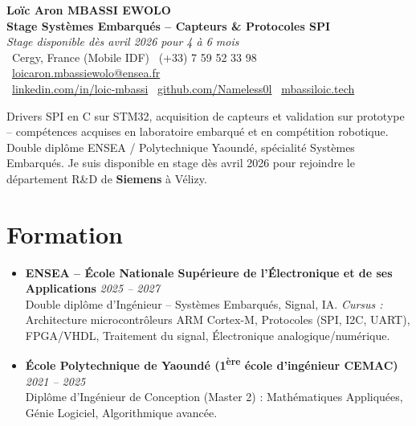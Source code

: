 \documentclass[a4paper,11pt]{article}
\begin{document}
\begin{center}
    {\Large \textbf{Loïc Aron MBASSI EWOLO}} \\ \vspace{4pt}
    \textbf{\large Stage Systèmes Embarqués -- Capteurs \& Protocoles SPI} \\
    \textit{\small Stage disponible dès avril 2026 pour 4 à 6 mois} \\ \vspace{4pt}
    \small
    \faMapMarker\ Cergy, France (Mobile IDF) \quad
    \faPhone\ (+33) 7 59 52 33 98 \quad
    \faEnvelope\ \href{mailto:loicaron.mbassiewolo@ensea.fr}{loicaron.mbassiewolo@ensea.fr} \\ \vspace{2pt}
    \faLinkedin\ \href{https://www.linkedin.com/in/loic-mbassi/}{linkedin.com/in/loic-mbassi} \quad
    \faGithub\ \href{https://github.com/Nameless0l}{github.com/Nameless0l} \quad
    \faGlobe\ \href{https://mbassiloic.tech}{mbassiloic.tech}
\end{center}

\vspace{-6pt}

\noindent\small{Drivers SPI en C sur STM32, acquisition de capteurs et validation sur prototype -- compétences acquises en laboratoire embarqué et en compétition robotique. Double diplôme ENSEA / Polytechnique Yaoundé, spécialité Systèmes Embarqués. Je suis disponible en stage dès avril 2026 pour rejoindre le département R\&D de \textbf{Siemens} à Vélizy.}

\section{Formation}
\begin{itemize}[leftmargin=*, label=\tiny$\bullet$, nosep]
    \item \textbf{ENSEA -- École Nationale Supérieure de l'Électronique et de ses Applications} \hfill \textit{2025 -- 2027} \\
    \small{Double diplôme d'Ingénieur -- Systèmes Embarqués, Signal, IA. \textit{Cursus :} Architecture microcontrôleurs ARM Cortex-M, Protocoles (SPI, I2C, UART), FPGA/VHDL, Traitement du signal, Électronique analogique/numérique.}
    \item \textbf{École Polytechnique de Yaoundé (1\textsuperscript{ère} école d'ingénieur CEMAC)} \hfill \textit{2021 -- 2025} \\
    \small{Diplôme d'Ingénieur de Conception (Master 2) : Mathématiques Appliquées, Génie Logiciel, Algorithmique avancée.}
\end{itemize}
\end{document}
